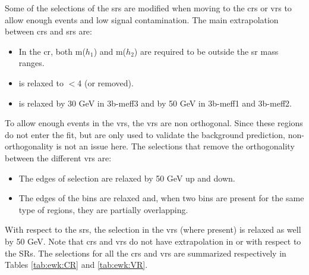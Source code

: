 Some of the selections of the \glspl{sr} are modified when moving to the \glspl{cr} or \glspl{vr}
 to allow enough events and low signal contamination.
The main extrapolation between \glspl{cr} and \glspl{sr} are:

\begin{itemize}
\item In the \gls{cr}, both m($h_1$) and m($h_2$) are required to be outside the \gls{sr} mass ranges.
\item \dRmax is relaxed to $<$4 (or removed).
\item \mtb is relaxed by 30 GeV in 3b-meff3 and by 50 GeV in 3b-meff1 and 3b-meff2.
\end{itemize}

To allow enough events in the \glspl{vr}, the \glspl{vr} are non orthogonal. Since these regions do not enter the fit, but are only used to validate the background prediction, non-orthogonality is not an issue here. 
The selections that remove the orthogonality between the different \glspl{vr} are:
\begin{itemize}
\item The edges of \meffb selection are relaxed by 50 GeV up and down.
\item The edges of the \dRmax bins are relaxed and, when two \dRmax bins are present for the same type of regions, they are partially overlapping.
\end{itemize}

With respect to the \glspl{sr}, the \mtb selection in the \glspl{vr} (where present) is relaxed as well by 50 GeV. 
Note that \glspl{cr} and \glspl{vr} do not have extrapolation in \nbjet or \njet with respect to the SRs.
The selections for all the \glspl{cr} and \glspl{vr} are summarized respectively in Tables \ref{tab:ewk:CR} and \ref{tab:ewk:VR}.


